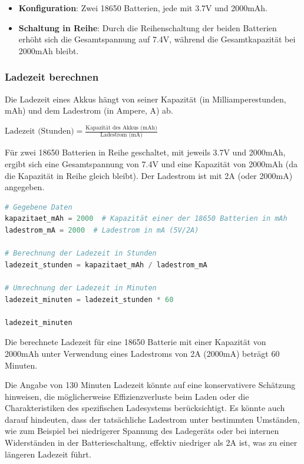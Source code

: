 \documentclass{vorlage-design-main}
\begin{document}
\begin{itemize}

\item
  \textbf{Konfiguration}: Zwei 18650 Batterien, jede mit 3.7V und
  2000mAh.
\item
  \textbf{Schaltung in Reihe}: Durch die Reihenschaltung der beiden
  Batterien erhöht sich die Gesamtspannung auf 7.4V, während die
  Gesamtkapazität bei 2000mAh bleibt.
\end{itemize}

\hypertarget{ladezeit-berechnen}{%
\subsubsection{Ladezeit berechnen}\label{ladezeit-berechnen}}

Die Ladezeit eines Akkus hängt von seiner Kapazität (in
Milliamperestunden, mAh) und dem Ladestrom (in Ampere, A) ab.

$\text{Ladezeit (Stunden)} = \frac{\text{Kapazität des Akkus (mAh)}}{\text{Ladestrom (mA)}}$

Für zwei 18650 Batterien in Reihe geschaltet, mit jeweils 3.7V und
2000mAh, ergibt sich eine Gesamtspannung von 7.4V und eine Kapazität von
2000mAh (da die Kapazität in Reihe gleich bleibt). Der Ladestrom ist mit
2A (oder 2000mA) angegeben.

\begin{lstlisting}[language=Python]
# Gegebene Daten
kapazitaet_mAh = 2000  # Kapazität einer der 18650 Batterien in mAh
ladestrom_mA = 2000  # Ladestrom in mA (5V/2A)

# Berechnung der Ladezeit in Stunden
ladezeit_stunden = kapazitaet_mAh / ladestrom_mA

# Umrechnung der Ladezeit in Minuten
ladezeit_minuten = ladezeit_stunden * 60

ladezeit_minuten
\end{lstlisting}

Die berechnete Ladezeit für eine 18650 Batterie mit einer Kapazität von
2000mAh unter Verwendung eines Ladestroms von 2A (2000mA) beträgt 60
Minuten.

Die Angabe von 130 Minuten Ladezeit könnte auf eine konservativere
Schätzung hinweisen, die möglicherweise Effizienzverluste beim Laden
oder die Charakteristiken des spezifischen Ladesystems berücksichtigt.
Es könnte auch darauf hindeuten, dass der tatsächliche Ladestrom unter
bestimmten Umständen, wie zum Beispiel bei niedrigerer Spannung des
Ladegeräts oder bei internen Widerständen in der Batterieschaltung,
effektiv niedriger als 2A ist, was zu einer längeren Ladezeit führt.
\end{document}
